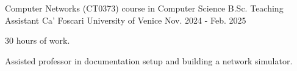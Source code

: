 
\begin{cventries}

    \cventry
        {Computer Networks (CT0373) course in Computer Science B.Sc.} %
        {Teaching Assistant} %
        {Ca' Foscari University of Venice} %
        {Nov. 2024 - Feb. 2025} %
        {
                \begin{cvitems} %
                        \item {30 hours of work.}
                        \item {Assisted professor in documentation setup and building a network simulator.}
                \end{cvitems}
        }
\end{cventries}